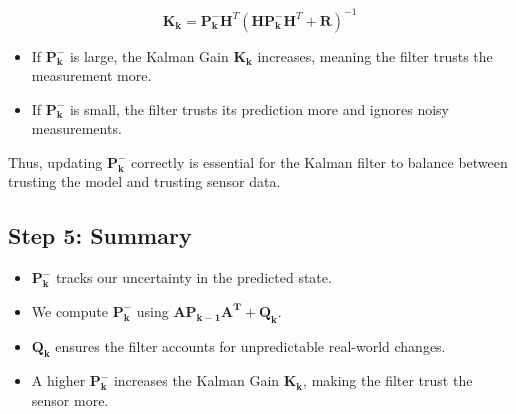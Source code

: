 \documentclass{article}
\begin{document}
\[
\mathbf{K_k} =
\mathbf{P_k^-} \mathbf{H}^T
(\mathbf{H P_k^- H}^T + \mathbf{R})^{-1}
\]

\begin{itemize}
    \item If \(\mathbf{P_k^-}\) is large, the Kalman Gain \(\mathbf{K_k}\) increases, meaning the filter trusts the measurement more.
    \item If \(\mathbf{P_k^-}\) is small, the filter trusts its prediction more and ignores noisy measurements.
\end{itemize}

Thus, updating \(\mathbf{P_k^-}\) correctly is essential for the Kalman filter to balance between trusting the model and trusting sensor data.

\subsection*{Step 5: Summary}
\begin{itemize}
    \item \(\mathbf{P_k^-}\) tracks our uncertainty in the predicted state.
    \item We compute \(\mathbf{P_k^-}\) using \(\mathbf{A P_{k-1} A^T} + \mathbf{Q_k}\).
    \item \(\mathbf{Q_k}\) ensures the filter accounts for unpredictable real-world changes.
    \item A higher \(\mathbf{P_k^-}\) increases the Kalman Gain \(\mathbf{K_k}\), making the filter trust the sensor more.
\end{itemize}
\end{document}
